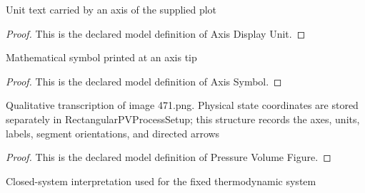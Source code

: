 \begin{definition}
  \label{def:physics:phyx-mini-0471:phyxminiproblems-problemphyxmini0471-axisdisplayunit}
  Unit text carried by an axis of the supplied plot
\end{definition}
\begin{proof}
  This is the declared model definition of Axis Display Unit.
\end{proof}
\begin{definition}
  \label{def:physics:phyx-mini-0471:phyxminiproblems-problemphyxmini0471-axissymbol}
  Mathematical symbol printed at an axis tip
\end{definition}
\begin{proof}
  This is the declared model definition of Axis Symbol.
\end{proof}
\begin{definition}
  \label{def:physics:phyx-mini-0471:phyxminiproblems-problemphyxmini0471-pressurevolumefigure}
  Qualitative transcription of image 471.png. Physical state coordinates are stored separately in RectangularPVProcessSetup; this structure records the axes, units, labels, segment orientations, and directed arrows
\end{definition}
\begin{proof}
  This is the declared model definition of Pressure Volume Figure.
\end{proof}
\begin{definition}
  \label{def:physics:phyx-mini-0471:phyxminiproblems-problemphyxmini0471-thermodynamicsystemboundary}
  Closed-system interpretation used for the fixed thermodynamic system
\end{definition}
